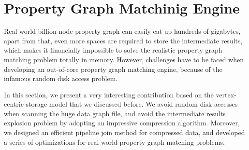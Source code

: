 \section{Property Graph Matchinig Engine}\label{sec:match}
Real world billion-node property graph can easily eat up hundreds of gigabytes,
apart from that, even more spaces are required to store the intermediate results,
which makes it financially impossible to solve the realistic property graph matching problem totally in memory.
However, challenges have to be faced when developing an out-of-core property graph matching engine,
because of the infamous random disk access problem.

In this section, we present a very interesting contribution based on the vertex-centric storage model that we discussed before.
We avoid random disk accesses when scanning the huge data graph file,
and avoid the intermediate results explosion problem by adopting an impressive compression algorithm.
Moreover, we designed an efficient pipeline join method for compressed data,
and developed a series of optimizations for real world property graph matching problems.




